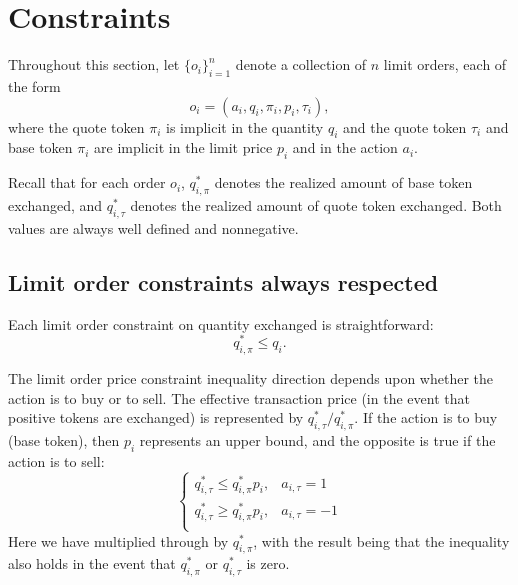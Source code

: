 \documentclass[11pt, reqno]{amsart}
\theoremstyle{definition}
\theoremstyle{remark}
\begin{document}
\section{Constraints}

Throughout this section, let $\{o_i\}_{i=1}^n$ denote a collection of $n$ limit
orders, each of the form
\[
	o_i = (a_i, q_i, \pi_i, p_i, \tau_i),
\]
where the quote token $\pi_i$ is implicit in the quantity $q_i$ and
the quote token $\tau_i$ and base token $\pi_i$ are implicit in the limit price
$p_i$ and in the action $a_i$.

Recall that for each order $o_i$, $q_{i, \pi}^*$ denotes the realized amount of
base token exchanged, and $q_{i, \tau}^*$ denotes the realized amount of quote
token exchanged. Both values are always well defined and nonnegative.

\subsection{Limit order constraints always respected}

Each limit order constraint on quantity exchanged is straightforward:
\begin{equation}\label{limit_order_quantity_constraint}
    q_{i, \pi}^* \leq q_i.
\end{equation}

The limit order price constraint inequality direction depends upon whether the
action is to buy or to sell.
The effective transaction price (in the event that positive tokens are
exchanged) is represented by $q_{i, \tau}^* / q_{i, \pi}^*$. If the action is to
buy (base token), then $p_i$ represents an upper bound, and the opposite is true
if the action is to sell:
\begin{equation}\label{limit_order_price_constraint}
    \begin{cases}
        q_{i, \tau}^* \leq q_{i, \pi}^* p_i, & a_{i, \tau} = 1 \\
        q_{i, \tau}^* \geq q_{i, \pi}^* p_i, & a_{i, \tau} = -1 \\
    \end{cases}
\end{equation}
Here we have multiplied through by $q_{i, \pi}^*$, with the result being that
the inequality also holds in the event that $q_{i, \pi}^*$ or $q_{i, \tau}^*$ is
zero.


\end{document}

